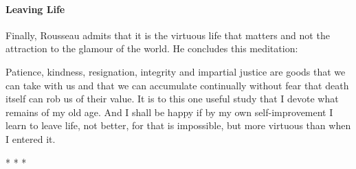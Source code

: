 \paragraph{Leaving Life}


Finally, Rousseau admits that it is the virtuous life that matters and not the attraction to the glamour of the world. He concludes this meditation:

\begin{quotex}
Patience, kindness, resignation, integrity and impartial justice are goods that we can take with us and that we can accumulate continually without fear that death itself can rob us of their value. It is to this one useful study that I devote what remains of my old age. And I shall be happy if by my own self-improvement I learn to leave life, not better, for that is impossible, but more virtuous than when I entered it.
\end{quotex}




\begin{center}* * *\end{center}

